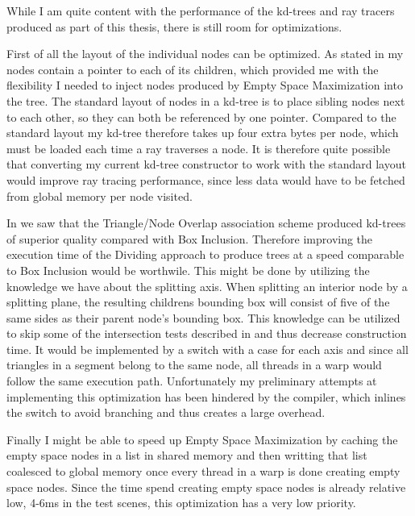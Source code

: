 
While I am quite content with the performance of the kd-trees and ray tracers
produced as part of this thesis, there is still room for optimizations.


First of all the layout of the individual nodes can be optimized. As stated in
 my nodes contain a pointer to each of its
children, which provided me with the flexibility I needed to inject nodes
produced by Empty Space Maximization into the tree. The standard layout of nodes
in a kd-tree is to place sibling nodes next to each other, so they can both be
referenced by one pointer. Compared to the standard layout my kd-tree therefore
takes up four extra bytes per node, which must be loaded each time a ray
traverses a node. It is therefore quite possible that converting my current
kd-tree constructor to work with the standard layout would improve ray tracing
performance, since less data would have to be fetched from global memory per
node visited.



In  we saw that the Triangle/Node Overlap association
scheme produced kd-trees of superior quality compared with Box
Inclusion. Therefore improving the execution time of the Dividing approach to
produce trees at a speed comparable to Box Inclusion would be worthwile. This
might be done by utilizing the knowledge we have about the splitting axis. When
splitting an interior node by a splitting plane, the resulting childrens
bounding box will consist of five of the same sides as their parent node's
bounding box. This knowledge can be utilized to skip some of the intersection
tests described in  and thus decrease construction
time. It would be implemented by a switch with a case for each axis and since
all triangles in a segment belong to the same node, all threads in a warp would
follow the same execution path. Unfortunately my preliminary attempts at
implementing this optimization has been hindered by the compiler, which inlines
the switch to avoid branching and thus creates a large overhead.


Finally I might be able to speed up Empty Space Maximization by caching the
empty space nodes in a list in shared memory and then writting that list
coalesced to global memory once every thread in a warp is done creating empty
space nodes. Since the time spend creating empty space nodes is already relative
low, 4-6ms in the test scenes, this optimization has a very low priority.







